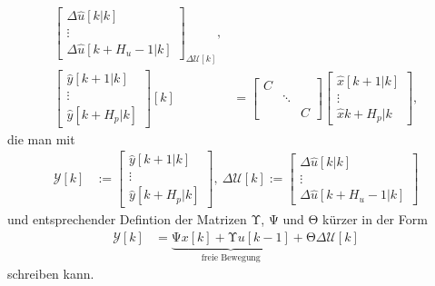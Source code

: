 \begin{align*}
{\begin{bmatrix}
\Delta\hat{u}[k|k]\\
\vdots\\
\Delta\hat{u}[k+H_u-1|k]
\end{bmatrix}}_{\Delta\mathcal{U}[k]},\\
\begin{bmatrix}
\hat{y}[k+1|k]\\ \vdots\\ \hat{y}[k+H_p|k]
\end{bmatrix}[k]& = \begin{bmatrix}
C	&			&	\\
	& \ddots	&	\\
	&			& C
\end{bmatrix}\begin{bmatrix}
\hat{x}[k+1|k]\\ \vdots\\ \hat{x}{k+H_p|k}
\end{bmatrix},
\end{align*}
die man mit 
\begin{align*}
	\mathcal{Y}[k] & := \begin{bmatrix}
	\hat{y}[k+1|k]\\
	\vdots\\
	\hat{y}[k+H_p|k]
	\end{bmatrix},\ \Delta\mathcal{U}[k]:=\begin{bmatrix}
	\Delta \hat{u}[k|k]\\
	\vdots\\
	\Delta\hat{u}[k+H_u-1|k]
	\end{bmatrix}
\end{align*}
und entsprechender Defintion der Matrizen $\mathrm{\Upsilon}$, $\mathrm{\Psi}$ und $\mathrm{\Theta}$ kürzer in der Form
\begin{align}
\mathcal{Y}[k] & = \underbrace{\mathrm{\Psi} x[k]+\mathrm{\Upsilon} u[k-1]}_{\text{freie Bewegung}}+\mathrm{\Theta}\Delta\mathcal{U}[k] \label{eqn:kap_4_zustandsraummodell_steuerdiff}
\end{align}
schreiben kann.

